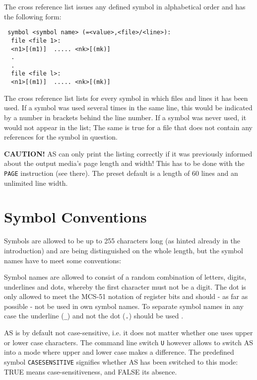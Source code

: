\documentclass[12pt,twoside]{report}
\newcommand{\bb}[1]{{\bf #1}}
\newcommand{\tty}[1]{{\tt #1}}
\begin{document}
The cross reference list issues any defined symbol in alphabetical 
order and has the following form:
\begin{verbatim}
 symbol <symbol name> (=<value>,<file>/<line>): 
  file <file 1>:
  <n1>[(m1)]  ..... <nk>[(mk)]
  .
  .
  file <file l>:
  <n1>[(m1)]  ..... <nk>[(mk)]
\end{verbatim}
The cross reference list lists for every symbol in which files and lines
it has been used.  If a symbol was used several times in the same line,
this would be indicated by a number in brackets behind the line number. 
If a symbol was never used, it would not appear in the list; The same is
true for a file that does not contain any references for the symbol in
question.

\bb{CAUTION!}  AS can only print the listing correctly if it was
previously informed about the output media's page length and width! 
This has to be done with the \tty{PAGE} instruction (see there).  The
preset default is a length of 60 lines and an unlimited line width.


\section{Symbol Conventions}
\label{SectSymConv}

Symbols are allowed to be up to 255 characters long (as hinted already 
in the introduction) and are being distinguished on the whole 
length, but the symbol names have to meet some conventions:
 
Symbol names are allowed to consist of a random combination of 
letters, digits, underlines and dots, whereby the first character must 
not be a digit. The dot is only allowed to meet the MCS-51 notation of 
register bits and should - as far as possible - not be used in own symbol 
names.  To separate symbol names in any case the underline (\tty{\_}) and not 
the dot (\tty{.}) should be used .

AS is by default not case-sensitive, i.e. it does not matter whether
one uses upper or lower case characters.  The command line switch \tty{U}
however allows to switch AS into a mode where upper and lower case
makes a difference.  The predefined symbol \tty{CASESENSITIVE} signifies
whether AS has been switched to this mode: TRUE means case-sensitiveness,
and FALSE its absence.
\end{document}
